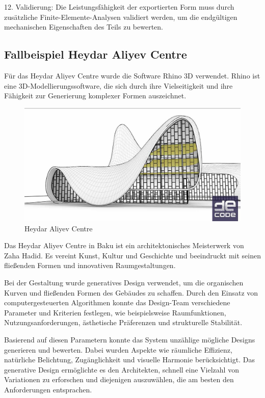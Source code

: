 12. Validierung: Die Leistungsfähigkeit der exportierten Form muss durch zusätzliche Finite-Elemente-Analysen validiert werden, um die endgültigen mechanischen Eigenschaften des Teils zu bewerten.

\subsection*{Fallbeispiel Heydar Aliyev Centre}
Für das Heydar Aliyev Centre wurde die Software Rhino 3D verwendet. Rhino ist eine 3D-Modellierungssoftware, die sich durch ihre Vielseitigkeit und ihre Fähigkeit zur Generierung komplexer Formen auszeichnet.

\begin{figure}[h]
    \begin{minipage}{0.5\textwidth}
      \centering
      \includegraphics[width=\textwidth]{./images/DE_Rh_lvl1_baku.jpg}
    \end{minipage}
    \caption{Heydar Aliyev Centre}
    \label{fig:meinbild}
  \end{figure}

  Das Heydar Aliyev Centre in Baku ist ein architektonisches Meisterwerk von Zaha Hadid. Es vereint Kunst, Kultur und Geschichte und beeindruckt mit seinen fließenden Formen und innovativen Raumgestaltungen.

  Bei der Gestaltung wurde generatives Design verwendet, um die organischen Kurven und fließenden Formen des Gebäudes zu schaffen. Durch den Einsatz von computergesteuerten Algorithmen konnte das Design-Team verschiedene Parameter und Kriterien festlegen, wie beispielsweise Raumfunktionen, Nutzungsanforderungen, ästhetische Präferenzen und strukturelle Stabilität.

  Basierend auf diesen Parametern konnte das System unzählige mögliche Designs generieren und bewerten. Dabei wurden Aspekte wie räumliche Effizienz, natürliche Belichtung, Zugänglichkeit und visuelle Harmonie berücksichtigt. Das generative Design ermöglichte es den Architekten, schnell eine Vielzahl von Variationen zu erforschen und diejenigen auszuwählen, die am besten den Anforderungen entsprachen.
  
